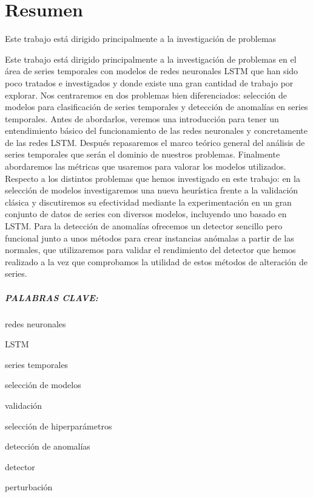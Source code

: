 %


\chapter*{Resumen}\label{ch:resumen}

Este trabajo está dirigido principalmente a la investigación de problemas

Este trabajo está dirigido principalmente a la investigación de problemas en el área de series temporales con modelos de redes neuronales LSTM que han sido poco tratados e investigados y donde existe una gran cantidad de trabajo por explorar. Nos centraremos en dos problemas bien diferenciados: selección de modelos para clasificación de series temporales y detección de anomalías en series temporales. Antes de abordarlos, veremos una introducción para tener un entendimiento básico del funcionamiento de las redes neuronales y concretamente de las redes LSTM. Después repasaremos el marco teórico general del análisis de series temporales que serán el dominio de nuestros problemas. Finalmente abordaremos las métricas que usaremos para valorar los modelos utilizados. Respecto a los distintos problemas que hemos investigado en este trabajo: en la selección de modelos investigaremos una nueva heurística frente a la validación clásica y discutiremos su efectividad mediante la experimentación en un gran conjunto de datos de series con diversos modelos, incluyendo uno basado en LSTM. Para la detección de anomalías ofrecemos un detector sencillo pero funcional junto a unos métodos para crear instancias anómalas a partir de las normales, que utilizaremos para validar el rendimiento del detector que hemos realizado a la vez que comprobamos la utilidad de estos métodos de alteración de series.

\paragraph{PALABRAS CLAVE:}
\begin{itemize*}[label=,itemsep=1em,itemjoin=\hspace{1em}]
  \item redes neuronales
  \item LSTM
  \item series temporales
  \item selección de modelos
  \item validación
  \item selección de hiperparámetros
  \item detección de anomalías
  \item detector
  \item perturbación
\end{itemize*}

\endinput

